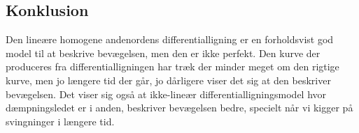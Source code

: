 \subsection{Konklusion}
Den lineære homogene andenordens differentialligning er en forholdsvist god model til at beskrive bevægelsen, men den er ikke perfekt. 
Den kurve der produceres fra differentialligningen har træk der minder meget om den rigtige kurve, men jo længere tid der går, jo dårligere viser det sig at den beskriver bevægelsen. 
Det viser sig også at ikke-lineær differentialligningsmodel hvor dæmpningsledet er i anden, beskriver bevægelsen bedre, specielt når vi kigger på svingninger i længere tid.

